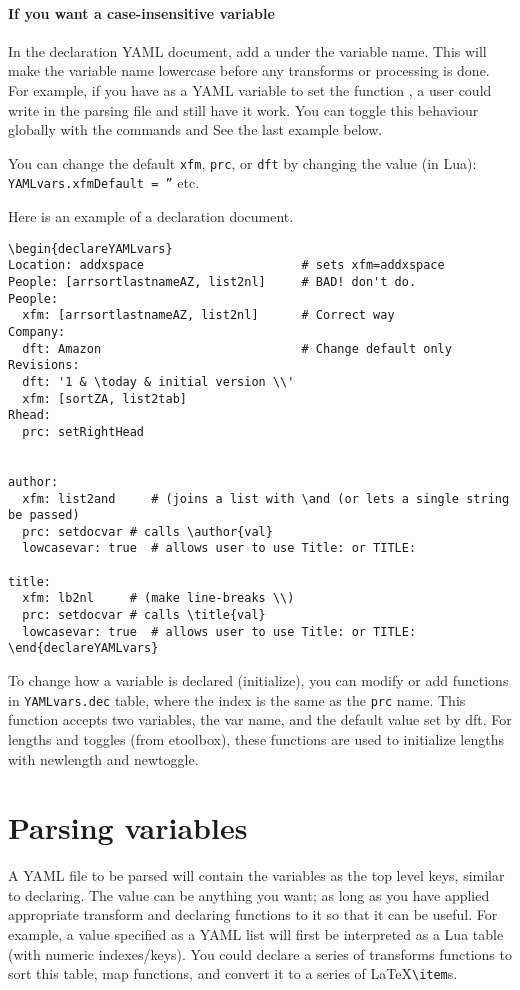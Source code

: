 \documentclass[11pt,parskip=half]{scrartcl}
\newcommand{\cmd}[1]{\texttt{\detokenize{#1}}}
\begin{document}
\paragraph{If you want a case-insensitive variable} In the declaration YAML document,
add a \cmd{lowcasevar: true} under the variable name.
This will make the variable name lowercase before any transforms or processing is done.
For example, if you have \cmd{title} as a YAML variable to set
the \cmd{prc} function \cmd{setdocvar}, a user could write
\cmd{Title} in the parsing file and still have it work.
You can toggle this behaviour globally with
the commands \cmd{\lowercasevarYVon} and \cmd{\lowercasevarYVoff}
See the last example below.

You can change the default \texttt{xfm}, \texttt{prc}, or \texttt{dft} by changing
the value (in Lua): \texttt{YAMLvars.xfmDefault = ''} etc.

Here is an example of a declaration document.
\begin{verbatim}
\begin{declareYAMLvars}
Location: addxspace                      # sets xfm=addxspace
People: [arrsortlastnameAZ, list2nl]     # BAD! don't do.
People:
  xfm: [arrsortlastnameAZ, list2nl]      # Correct way
Company:
  dft: Amazon                            # Change default only
Revisions:
  dft: '1 & \today & initial version \\'
  xfm: [sortZA, list2tab]
Rhead:
  prc: setRightHead


author:
  xfm: list2and     # (joins a list with \and (or lets a single string be passed)
  prc: setdocvar # calls \author{val}
  lowcasevar: true  # allows user to use Title: or TITLE:
  
title:
  xfm: lb2nl     # (make line-breaks \\)
  prc: setdocvar # calls \title{val}
  lowcasevar: true  # allows user to use Title: or TITLE:
\end{declareYAMLvars}
\end{verbatim}


To change how a variable is declared (initialize), you can modify or add functions in
\texttt{YAMLvars.dec} table, where the index is the same as the \texttt{prc} name. 
This function accepts two variables, the var name, and the default value set by dft.
For lengths and toggles (from etoolbox), these functions are used to initialize lengths
with newlength and newtoggle.


\section{Parsing variables}
A YAML file to be parsed will contain the variables as the top level keys, similar to declaring.
The value can be anything you want; as long as you have applied appropriate transform and declaring
functions to it so that it can be useful. For example, a value specified as a YAML list will first be
interpreted as a Lua table (with numeric indexes/keys). You could declare a series of transforms functions
to sort this table, map functions, and convert it to a series of \LaTeX  \texttt{\textbackslash item}s.
\end{document}
